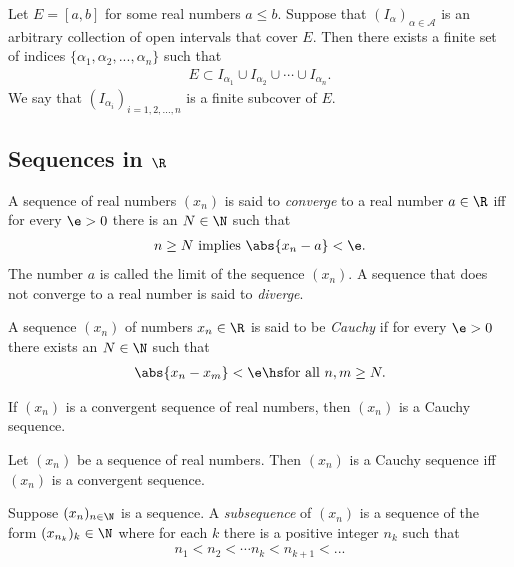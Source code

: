 \documentclass{article}
\begin{document}
\begin{theorem}[Notes 1.2]
	Let $E=[a,b]$ for some real numbers $a\leq b$. Suppose that $(I_\alpha)_{\alpha\in\mathcal{A}}$
	is an arbitrary collection of open intervals that cover $E$. Then there exists a finite
	set of indices $\{\alpha_1, \alpha_2, ..., \alpha_n\}$ such that
	\begin{align*}
		E \subset I_{\alpha_1} \cup I_{\alpha_2}\cup \cdots \cup I_{\alpha_n}.
	\end{align*}
	We say that $(I_{\alpha_i})_{i=1,2,...,n}$ is a finite subcover of $E$.
\end{theorem}

\subsection{Sequences in $\R$}

\begin{definition}
	A sequence of real numbers $(x_n)$ is said to \emph{converge} to a real number
	$a\in\R$ iff for every $\e>0$ there is an $N\in\N$ such that
	\begin{align*}
		n\geq N \text{ implies } \abs{x_n-a} < \e.
	\end{align*}
	The number $a$ is called the limit of the sequence $(x_n)$. A sequence that
	does not converge to a real number is said to \emph{diverge}.
\end{definition}

\begin{definition}
	A sequence $(x_n)$ of numbers $x_n\in\R$ is said to be \emph{Cauchy} if for every $\e>0$ there
	exists an $N\in\N$ such that
	\begin{align*}
		\abs{x_n-x_m}<\e \hs \text{for all }n,m\geq N.
	\end{align*}
\end{definition}

\begin{theorem}[Notes 1.3]
	If $(x_n)$ is a convergent sequence of real numbers, then $(x_n)$ is a Cauchy sequence.
\end{theorem}

\begin{theorem}[Cauchy]
	Let $(x_n)$ be a sequence of real numbers. Then $(x_n)$ is a Cauchy sequence iff $(x_n)$ is a convergent sequence.
\end{theorem}

\begin{definition}
	Suppose $(x_n)_{n\in\N}$ is a sequence. A \emph{subsequence} of $(x_n)$ is a sequence of the form
	$(x_{n_k})_k\in\N$ where for each $k$ there is a positive integer $n_k$ such that
	\begin{align*}
		n_1 < n_2 < \cdots n_k < n_{k+1} < ...
	\end{align*}
\end{definition}
\end{document}
